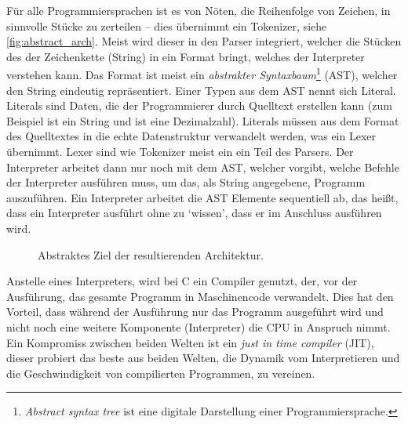       Für alle Programmiersprachen ist es von Nöten, die Reihenfolge von Zeichen, in sinnvolle Stücke zu zerteilen -- dies übernimmt ein Tokenizer, siehe \autoref{fig:abstract_arch}. Meist wird dieser in den Parser \autocite[S.46]{eirund2013formale} integriert, welcher die Stücken des der Zeichenkette (String) in ein Format bringt, welches der Interpreter verstehen kann. Das Format ist meist ein \emph{abstrakter Syntaxbaum}\footnote{
        \textit{Abstract syntax tree} ist eine digitale Darstellung einer Programmiersprache.
      } (AST), welcher den String eindeutig repräsentiert. Einer Typen aus dem AST nennt sich Literal. Literals sind Daten, die der Programmierer durch Quelltext erstellen kann (zum Beispiel ist  ein String und  ist eine Dezimalzahl). Literals müssen aus dem Format des Quelltextes in die echte Datenstruktur verwandelt werden, was ein Lexer übernimmt. Lexer sind wie Tokenizer meist ein ein Teil des Parsers. Der Interpreter arbeitet dann nur noch mit dem AST, welcher vorgibt, welche Befehle der Interpreter ausführen muss, um das, als String angegebene, Programm auszuführen. Ein Interpreter arbeitet die AST Elemente sequentiell ab, das heißt, dass ein Interpreter  ausführt ohne zu `wissen', dass er im Anschluss  ausführen wird.
      \begin{figure}[H]
        \centering
        \caption{Abstraktes Ziel der resultierenden Architektur.}
        \label{fig:abstract_arch}
      \end{figure}
      Anstelle eines Interpreters, wird bei C ein Compiler genutzt, der, vor der Ausführung, das gesamte Programm in Maschinencode verwandelt. Dies hat den Vorteil, dass während der Ausführung nur das Programm ausgeführt wird und nicht noch eine weitere Komponente (Interpreter) die CPU in Anspruch nimmt. Ein Kompromiss zwischen beiden Welten ist ein \emph{just in time compiler} (JIT), dieser probiert das beste aus beiden Welten, die Dynamik vom Interpretieren und die Geschwindigkeit von compilierten Programmen, zu vereinen.

